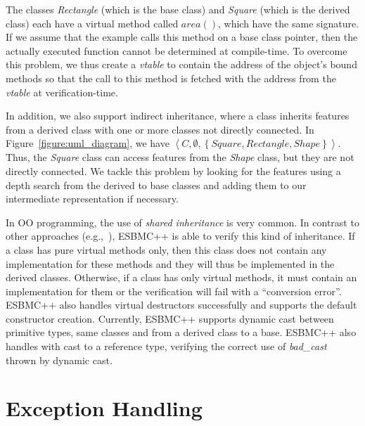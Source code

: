 \documentclass[conference]{IEEEtran}
\begin{document}
The classes \textit{Rectangle} (which is the base class)
and \textit{Square} (which is the derived class) each have a virtual method
called $\mathit{area}()$, which have the same signature.
If we assume that the example
calls this method on a base class pointer, then the actually executed function
cannot be determined at compile-time.
To overcome this problem,
we thus create a \textit{vtable} to contain the address of the object's bound
methods so that the call to this method is fetched with the address from
the \textit{vtable} at verification-time.

In addition, we also support indirect inheritance,
where a class inherits features from a derived class with one
or more classes not directly connected. In Figure~\ref{figure:uml_diagram}, we have
$\left\langle C, \emptyset, \left\{ Square, Rectangle, Shape \right\} \right\rangle$.
Thus, the \textit{Square} class can access features from the \textit{Shape} class,
but they are not directly connected. We tackle this problem by
looking for the features using a depth search from the derived to base classes
and adding them to our intermediate representation if necessary.

In OO programming, the use of \textit{shared inheritance} is very common.
In contrast to other approaches (e.g.,~\cite{Blanc07}), ESBMC++ is able to
verify this kind of inheritance. If a class has pure virtual methods only,
then this class does not contain any implementation for these methods and they will
thus be implemented in the derived classes. Otherwise, if a class has only virtual
methods, it must contain an implementation for them or the verification will fail
with a ``conversion error''. ESBMC++ also handles virtual destructors successfully
and supports the default constructor creation. Currently, ESBMC++
supports dynamic cast between primitive types, same classes and from a derived
class to a base. ESBMC++ also handles with cast to a reference type, verifying the
correct use of \textit{bad\_cast} thrown by dynamic cast.


\section{Exception Handling}
\label{exception-handling}
\end{document}
